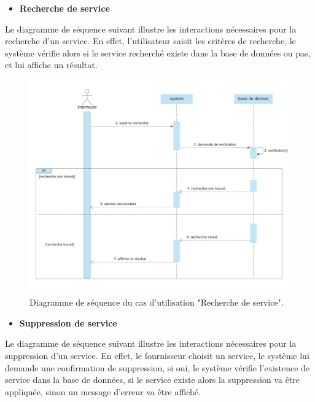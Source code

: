 \documentclass[french]{report}
\begin{document}
\begin{itemize}
\item \textbf{Recherche de service}
\end{itemize}
    Le diagramme de séquence suivant illustre les interactions nécessaires pour la recherche d'un service. En effet,
    l'utilisateur saisit les critères de recherche, le système vérifie alors si le service recherché existe dans la
    base de données ou pas, et lui affiche un résultat.
        
    \begin{figure}[H]
            \centering
            \includegraphics[width=1\textwidth]{images/sequence diag recherche service.jpg}
            \caption{Diagramme de séquence du cas d'utilisation "Recherche de service".}
            \label{fig:my_label}
    \end{figure}

\begin{itemize}
\item \textbf{Suppression de service}
\end{itemize}

    Le diagramme de séquence suivant illustre les interactions nécessaires pour la suppression d'un service. En effet,
    le fournisseur choisit un service, le système lui demande une confirmation de suppression, si oui, le système 
    vérifie l'existence de service dans la base de données, si le service existe alors la suppression va être appliquée,
    sinon un message d'erreur va être affiché.
        
\end{document}
